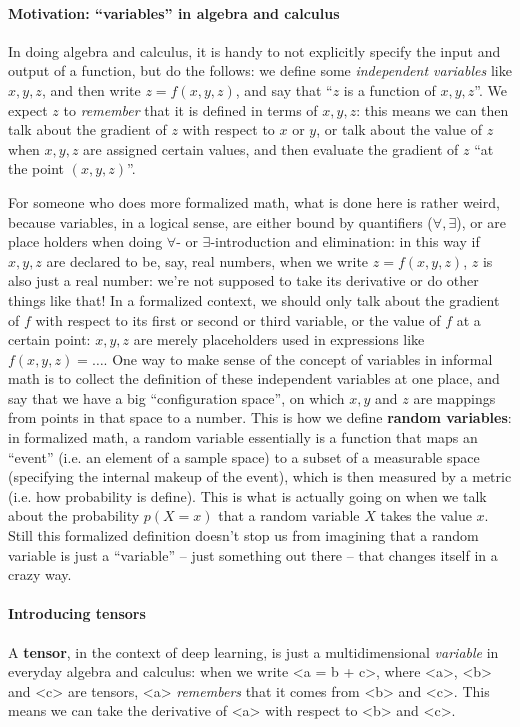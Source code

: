 \documentclass[hyperref, a4paper, 12pt]{report}
\newcommand*{\concept}[1]{{\textbf{#1}}}
\def\texttt#1{<#1>}%
\newcommand{\shortcode}[1]{\texttt{#1}}
\begin{document}
\paragraph*{Motivation: ``variables'' in algebra and calculus}
In doing algebra and calculus, it is handy to not explicitly specify the input and output of a function, but do the follows:
we define some \emph{independent variables} like $x, y, z$,
and then write $z = f(x, y, z)$, and say that ``$z$ is a function of $x, y, z$''.
We expect $z$ to \emph{remember} that it is defined in terms of $x, y, z$:
this means we can then talk about the gradient of $z$ with respect to $x$ or $y$,
or talk about the value of $z$ when $x, y, z$ are assigned certain values,
and then evaluate the gradient of $z$ ``at the point $(x, y, z)$''.

For someone who does more formalized math,
what is done here is rather weird, because variables, in a logical sense,
are either bound by quantifiers ($\forall, \exists$),
or are place holders when doing $\forall$- or $\exists$-introduction and elimination:
in this way if $x, y, z$ are declared to be, say, real numbers,
when we write $z = f(x, y, z)$,
$z$ is also just a real number:
we're not supposed to take its derivative or do other things like that!
In a formalized context, we should only talk about the gradient of $f$ with respect to its first or second or third variable,
or the value of $f$ at a certain point:
$x, y ,z$ are merely placeholders used in expressions like $f(x, y, z) = \dots$.
One way to make sense of the concept of variables in informal math is 
to collect the definition of these independent variables at one place,
and say that we have a big ``configuration space'',
on which $x, y$ and $z$ are mappings from points in that space to a number.
This is how we define \concept{random variables}:
in formalized math, a random variable essentially is a function that maps an ``event'' (i.e. an element of a sample space) to a subset of a measurable space (specifying the internal makeup of the event),
which is then measured by a metric (i.e. how probability is define).
This is what is actually going on when we talk about the probability $p(X=x)$ that a random variable $X$ takes the value $x$.
Still this formalized definition doesn't stop us from imagining that a random variable is just a ``variable'' -- just something out there -- that changes itself in a crazy way.

\paragraph*{Introducing tensors}
A \concept{tensor}, in the context of deep learning,
is just a multidimensional \emph{variable} in everyday algebra and calculus:
when we write \shortcode{a = b + c},
where \shortcode{a}, \shortcode{b} and \shortcode{c} are tensors,
\shortcode{a} \emph{remembers} that it comes from \shortcode{b} and \shortcode{c}.
This means we can take the derivative of \shortcode{a} with respect to \shortcode{b} and \shortcode{c}.
\end{document}

